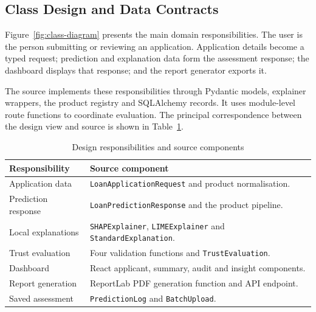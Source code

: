 
\subsection{Class Design and Data Contracts}
Figure~\ref{fig:class-diagram} presents the main domain responsibilities. The user is the person submitting or reviewing an application. Application details become a typed request; prediction and explanation data form the assessment response; the dashboard displays that response; and the report generator exports it.

The source implements these responsibilities through Pydantic models, explainer wrappers, the product registry and SQLAlchemy records. It uses module-level route functions to coordinate evaluation. The principal correspondence between the design view and source is shown in Table~\ref{tab:design-source-map}.


\begin{table}[htbp]\centering\small
\caption{Design responsibilities and source components}\label{tab:design-source-map}
\begin{tabularx}{\textwidth}{p{3.8cm}X}\toprule
Responsibility & Source component\\\midrule
Application data & \texttt{LoanApplicationRequest} and product normalisation.\\
Prediction response & \texttt{LoanPredictionResponse} and the product pipeline.\\
Local explanations & \texttt{SHAPExplainer}, \texttt{LIMEExplainer} and \texttt{StandardExplanation}.\\
Trust evaluation & Four validation functions and \texttt{TrustEvaluation}.\\
Dashboard & React applicant, summary, audit and insight components.\\
Report generation & ReportLab PDF generation function and API endpoint.\\
Saved assessment & \texttt{PredictionLog} and \texttt{BatchUpload}.\\\bottomrule
\end{tabularx}\end{table}

